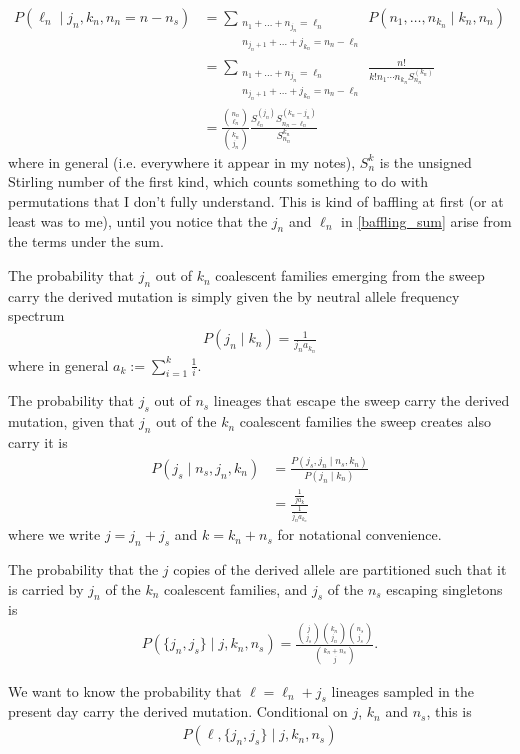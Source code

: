 \documentclass[reqno]{amsart}
\begin{document}
\begin{align}
	P\left(\ell_n \mid j_n , k_n , n_n = n - n_s\right) &= \sum_{\substack{n_1+\dots+n_{j_n}=\ell_n \\ n_{j_{n}+1 } + \dots + j_{k_n} = n_n - \ell_n } }P\left(n_1,\dots,n_{k_n} \mid k_n , n_n\right) \\
	&= \sum_{\substack{n_1+\dots+n_{j_n}=\ell_n \\ n_{j_{n}+1 } + \dots + j_{k_n} = n_n - \ell_n} } \frac{n!}{k!n_1\dotsi n_{k_n}S_{n_n}^{(k_n)}} \\
	&= \frac{\binom{n_n}{\ell_n}}{\binom{k_n}{j_n}}\frac{S_{\ell_n}^{(j_n)}S_{n_n - \ell_n}^{(k_n- j_n)}}{S_{n_n}^{k_n}} \label{baffling_sum}
\end{align}
where in general (i.e. everywhere it appear in my notes), $S_n^k$ is the unsigned Stirling number of the first kind, which counts something to do with permutations that I don't fully understand. This is kind of baffling at first (or at least was to me), until you notice that the $j_n$ and $\ell_n$ in \eqref{baffling_sum} arise from the terms under the sum.

The probability that $j_n$ out of $k_n$ coalescent families emerging from the sweep carry the derived mutation is simply given the by neutral allele frequency spectrum
\begin{align}
	P(j_n \mid k_n) = \frac{1}{j_n a_{k_n}}
\end{align}
where in general $a_{k}:=\sum_{i=1}^{k}\frac{1}{i}$.

The probability that $j_s$ out of $n_s$ lineages that escape the sweep carry the derived mutation, given that $j_n$ out of the $k_n$ coalescent families the sweep creates also carry it is
\begin{align}
	P ( j_s \mid n_s , j_n , k_n ) &= \frac{P(j_s , j_n \mid n_s , k_n )}{P(j_n \mid k_n)} \\ 
	&= \frac{\frac{1}{ja_k}}{\frac{1}{j_n a_{k_n}}}
\end{align}
where we write $j = j_n + j_s$ and $k = k_n + n_s$ for notational convenience.

The probability that the $j$ copies of the derived allele are partitioned such that it is carried by $j_n$ of the $k_n$ coalescent families, and $j_s$ of the $n_s$ escaping singletons is
\begin{align}
	P(\{j_n,j_s\}\mid j , k_n , n_s) = \frac{\binom{j}{j_s}\binom{k_n}{j_n}\binom{n_s}{j_s}}{\binom{k_n+n_s}{j}}.
\end{align}

We want to know the probability that $\ell = \ell_n + j_s$ lineages sampled in the present day carry the derived mutation. Conditional on $j$, $k_n$ and $n_s$, this is
\begin{align}
	P(\ell,\{j_n,j_s\}\mid j , k_n , n_s )
\end{align}
\end{document}
